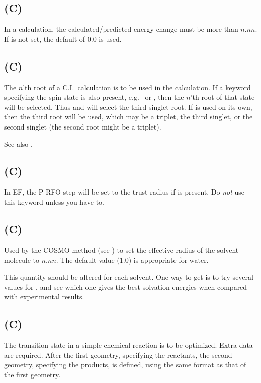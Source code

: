 \subsection*{ (C)}
In a  calculation, the calculated/predicted energy change must be more
than $n.nn$.  If  is not set, the default of 0.0 is used.

\subsection*{ (C)}
        The  $n$'th  root  of  a  C.I.\ calculation  is  to  be  used  in   the
   calculation.   If  a  keyword  specifying the spin-state is also present,
   e.g.\   or , then the  $n$'th  root  of  that  state  will  be
   selected.   Thus    and  will select the third singlet root.
   If  is used on its own, then the third root will be used, which may
   be  a  triplet, the third singlet, or the second singlet (the second root
   might be a triplet).

See also .

\subsection*{ (C)}

In EF, the P-RFO step will be set to the trust radius if  is
present.  Do {\em not} use this keyword unless you have to.

\subsection*{ (C)}
Used by the COSMO method (see ) to set the
effective radius of the solvent molecule to $n.nn$.  The default value
(1.0) is appropriate for water.

 This quantity should be altered for each solvent.
One way to get  is to try several values for , and see
which one gives the best solvation energies when compared with
experimental results.

\subsection*{ (C)}
        The transition  state  in  a  simple  chemical  reaction  is  to  be
   optimized.    Extra   data  are  required.   After  the  first  geometry,
   specifying the reactants,
   the  second geometry, specifying the products, is defined, using the same
   format as that of the first geometry.

